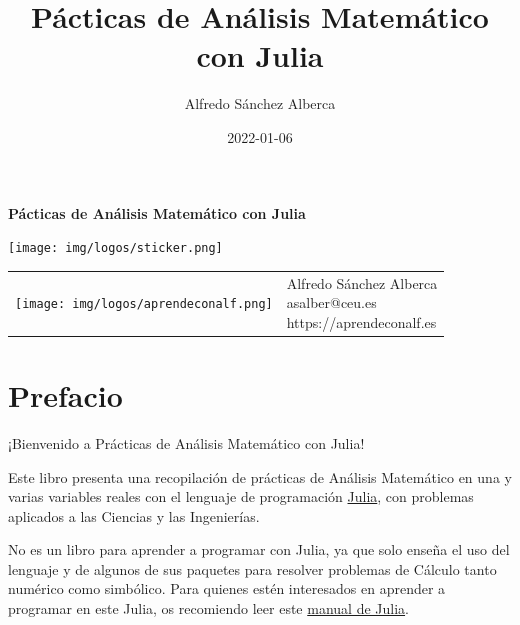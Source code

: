 \documentclass[
  a4paper,
]{scrreport}
\title{Pácticas de Análisis Matemático con Julia}
\author{Alfredo Sánchez Alberca}
\date{2022-01-06}
\renewcommand*\contentsname{Tabla de contenidos}
\newcommand\contentsname{Tabla de contenidos}
\theoremstyle{definition}
\theoremstyle{remark}
\begin{document}
\begin{titlepage}

\begin{center}
\vspace*{5cm}

\Huge
{\textbf{\textsf{Pácticas de Análisis Matemático con Julia}}}

\vspace{0.5cm}
\LARGE
{\textbf{\textsf{}}}

\vspace{1.5cm}

\texttt{[image: img/logos/sticker.png]}
\end{center}

\vfill

\begin{flushleft}
\begin{tabular}{ll}
\texttt{[image: img/logos/aprendeconalf.png]} & \parbox[b]{5cm}{\Large\textsf{Alfredo
Sánchez
Alberca}\\ \textsf{asalber@ceu.es} \\ \textsf{https://aprendeconalf.es}}
\end{tabular}
\end{flushleft}
\end{titlepage}
\renewcommand*\contentsname{Tabla de contenidos}
{
\hypersetup{linkcolor=}
\setcounter{tocdepth}{2}
\tableofcontents
}

\chapter*{Prefacio}\label{prefacio}


¡Bienvenido a Prácticas de Análisis Matemático con Julia!

Este libro presenta una recopilación de prácticas de Análisis Matemático
en una y varias variables reales con el lenguaje de programación
\href{https://julialang.org/}{Julia}, con problemas aplicados a las
Ciencias y las Ingenierías.

No es un libro para aprender a programar con Julia, ya que solo enseña
el uso del lenguaje y de algunos de sus paquetes para resolver problemas
de Cálculo tanto numérico como simbólico. Para quienes estén interesados
en aprender a programar en este Julia, os recomiendo leer este
\href{https://aprendeconalf.es/manual-julia/}{manual de Julia}.
\end{document}
